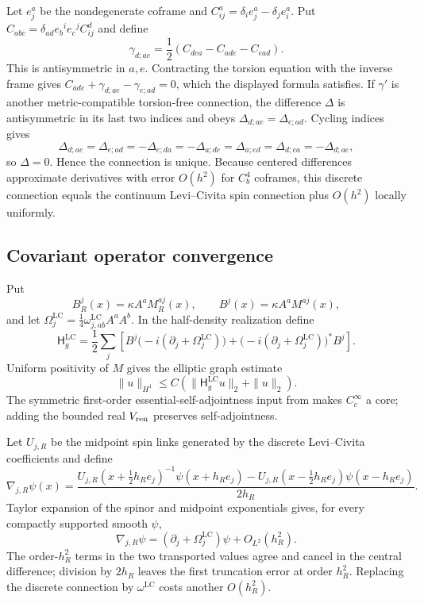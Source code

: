 \documentclass[11pt]{article}
\theoremstyle{definition}
\theoremstyle{remark}
\newcommand{\Ham}{\mathsf H}
\newcommand{\LC}{\mathrm{LC}}
\begin{document}
Let $e^a_j$ be the nondegenerate coframe and
$C^a_{ij}=\delta_i e^a_j-\delta_j e^a_i$.  Put
$C_{abc}=\delta_{ad}e_b{}^ie_c{}^jC^d_{ij}$ and define
\[
 \gamma_{d;ae}
 =\frac12(C_{dea}-C_{ade}-C_{ead}).
\]
This is antisymmetric in $a,e$.  Contracting the torsion equation with the
inverse frame gives
$C_{ade}+\gamma_{d;ae}-\gamma_{e;ad}=0$, which the displayed formula satisfies.
If $\gamma'$ is another metric-compatible torsion-free connection, the
difference $\Delta$ is antisymmetric in its last two indices and obeys
$\Delta_{d;ae}=\Delta_{e;ad}$.  Cycling indices gives
\[
 \Delta_{d;ae}=\Delta_{e;ad}=-\Delta_{e;da}
 =-\Delta_{a;de}=\Delta_{a;ed}=\Delta_{d;ea}
 =-\Delta_{d;ae},
\]
so $\Delta=0$.  Hence the connection is unique.  Because centered differences
approximate derivatives with error $O(h^2)$ for $C_b^4$ coframes, this discrete
connection equals the continuum Levi--Civita spin connection plus $O(h^2)$
locally uniformly.

\subsection{Covariant operator convergence}

Put
\[
 B_R^j(x)=\kappa A^aM_R^{aj}(x),
 \qquad B^j(x)=\kappa A^aM^{aj}(x),
\]
and let
$\Omega_j^{\LC}=\tfrac14\omega^{\LC}_{j,ab}A^aA^b$.  In the half-density
realization define
\[
 \Ham_g^{\LC}
 =\frac12\sum_j\left[
 B^j\bigl(-i(\partial_j+\Omega_j^{\LC})\bigr)
 +\bigl(-i(\partial_j+\Omega_j^{\LC})\bigr)^*B^j
 \right].
\]
Uniform positivity of $M$ gives the elliptic graph estimate
\[
 \|u\|_{H^1}\le C(\|\Ham_g^{\LC}u\|_2+\|u\|_2).
\]
The symmetric first-order essential-self-adjointness input from
 makes $C_c^\infty$ a core; adding the bounded real
$V_{\rm ren}$ preserves self-adjointness.

Let $U_{j,R}$ be the midpoint spin links generated by the discrete
Levi--Civita coefficients and define
\[
 \nabla_{j,R}\psi(x)=
 \frac{U_{j,R}(x+\tfrac12h_Re_j)^{-1}\psi(x+h_Re_j)
 -U_{j,R}(x-\tfrac12h_Re_j)\psi(x-h_Re_j)}{2h_R}.
\]
Taylor expansion of the spinor and midpoint exponentials gives, for every
compactly supported smooth $\psi$,
\[
 \nabla_{j,R}\psi
 =(\partial_j+\Omega_j^{\LC})\psi+O_{L^2}(h_R^2).
\]
The order-$h_R^2$ terms in the two transported values agree and cancel in the
central difference; division by $2h_R$ leaves the first truncation error at
order $h_R^2$.  Replacing the discrete connection by
$\omega^{\LC}$ costs another $O(h_R^2)$.
\end{document}
